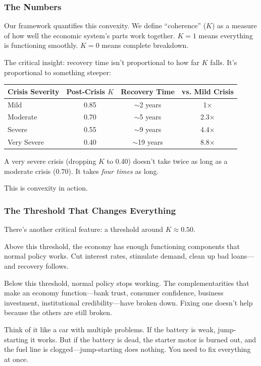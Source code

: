 \subsubsection{The Numbers}

Our framework quantifies this convexity. We define ``coherence'' ($K$) as 
a measure of how well the economic system's parts work together. $K = 1$ 
means everything is functioning smoothly. $K = 0$ means complete breakdown.

The critical insight: recovery time isn't proportional to how far $K$ falls. 
It's proportional to something steeper:

\begin{center}
\renewcommand{\arraystretch}{1.3}
\begin{tabular}{lccc}
\hline
\textbf{Crisis Severity} & \textbf{Post-Crisis $K$} & \textbf{Recovery Time} & \textbf{vs. Mild Crisis} \\
\hline
Mild & 0.85 & $\sim$2 years & 1× \\
Moderate & 0.70 & $\sim$5 years & 2.3× \\
Severe & 0.55 & $\sim$9 years & 4.4× \\
Very Severe & 0.40 & $\sim$19 years & 8.8× \\
\hline
\end{tabular}
\end{center}

A very severe crisis (dropping $K$ to 0.40) doesn't take twice as long 
as a moderate crisis (0.70). It takes \emph{four times} as long.

This is convexity in action.

\subsubsection{The Threshold That Changes Everything}

There's another critical feature: a threshold around $K \approx 0.50$.

Above this threshold, the economy has enough functioning components that 
normal policy works. Cut interest rates, stimulate demand, clean up bad 
loans---and recovery follows.

Below this threshold, normal policy stops working. The complementarities 
that make an economy function---bank trust, consumer confidence, business 
investment, institutional credibility---have broken down. Fixing one doesn't 
help because the others are still broken.

Think of it like a car with multiple problems. If the battery is weak, 
jump-starting it works. But if the battery is dead, the starter motor is 
burned out, and the fuel line is clogged---jump-starting does nothing. 
You need to fix everything at once.

